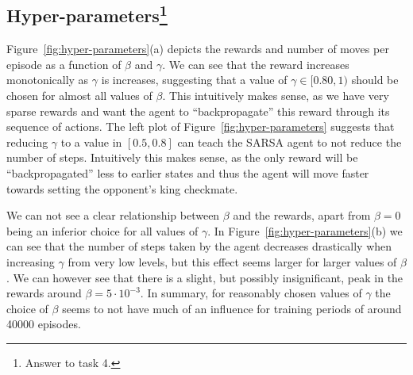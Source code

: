 \documentclass[conference]{IEEEtran}
\begin{document}
\subsection{Hyper-parameters\footnote{Answer to task 4.}}\label{sec:hyper-parameters}


Figure~\ref{fig:hyper-parameters}(a) depicts the rewards and number of moves per episode as a function of $\beta$ and $\gamma$. We can see that the reward increases monotonically as $\gamma$ is increases, suggesting that a value of $\gamma\in[0.80, 1)$ should be chosen for almost all values of $\beta$. This intuitively makes sense, as we have very sparse rewards and want the agent to ``backpropagate'' this reward through its sequence of actions. The left plot of Figure~\ref{fig:hyper-parameters} suggests that reducing $\gamma$ to a value in $[0.5, 0.8]$ can teach the SARSA agent to not reduce the number of steps. Intuitively this makes sense, as the only reward will be ``backpropagated'' less to earlier states and thus the agent will move faster towards setting the opponent's king checkmate.

We can not see a clear relationship between $\beta$ and the rewards, apart from $\beta=0$ being an inferior choice for all values of $\gamma$. In Figure~\ref{fig:hyper-parameters}(b) we can see that the number of steps taken by the agent decreases drastically when increasing $\gamma$ from very low levels, but this effect seems larger for larger values of $\beta$. We can however see that there is a slight, but possibly insignificant, peak in the rewards around $\beta = 5\cdot 10^{-3}$. In summary, for reasonably chosen values of $\gamma$ the choice of $\beta$ seems to not have much of an influence for training periods of around 40000 episodes.
\end{document}
